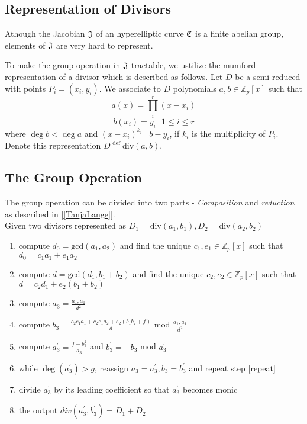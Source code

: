 \subsection{Representation of Divisors}

Athough the Jacobian $\mathfrak{J}$ of an hyperelliptic curve $\mathfrak{C}$ is a finite abelian group, elements of $\mathfrak{J}$ are very hard to represent. 



To make the group operation in $\mathfrak{J}$ tractable, we ustilize the mumford representation of a divisor which is described as follows. Let $D$ be a semi-reduced with points $P_i = (x_i,y_i)$. We associate to $D$ polynomials $a,b \in \mathbb{Z}_p[x]$ such that $$a(x) = \prod^r_i (x - x_i) $$ $$ b(x_i) = y_i \text{ } 1 \leq i \leq r $$ where $\deg b < \deg a$ and $(x - x_i)^{k_i} \mid b - y_i$, if $k_i$ is the multiplicity of $P_i$. Denote this representation $D \stackrel{\text{def}}{=} \text{div} (a,b)$.

\subsection{The Group Operation}

The group operation can be divided into two parts - \textit{Composition} and \textit{reduction} as described in [\ref{TanjaLange}]. \\ 	

Given two divisors represented as $D_1= \text{div}(a_1,b_1), D_2 = \text{div} (a_2,b_2) $ 

\begin{enumerate}[1.]
	\item compute $d_0 = \text{gcd}(a_1,a_2)$ and find the unique $c_1,e_1 \in \mathbb{Z}_p[x]$ such that $d_0 = c_1a_1 + e_1a_2$ 
	\item compute $d = \text{gcd}(d_1,b_1 + b_2)$ and find the unique $c_2, e_2 \in \mathbb{Z}_p[x]$ such that $d = c_2d_1 + e_2(b_1 + b_2)$ 
	\item compute $a_3 = \frac{a_1,a_1}{d^2}$
	\item compute $b_3 = \frac{c_2c_1a_1 + c_2e_1a_2 + e_2(b_1b_2 + f)}{d} \text{ mod } \frac{a_1,a_1}{d^2}$
	\item \label{repeat} compute $a_3^\prime = \frac{f - b_3^2}{a_3}$ and $b_3^\prime = - b_3$ mod $a_3^\prime$ 
	\item while $\deg (a_3^\prime ) > g$, reassign $a_3 = a_3^\prime, b_3 = b_3^\prime$ and repeat step \ref{repeat}
	\item divide $a_3^\prime $ by its leading coefficient so that $a_3^\prime $ becomes monic
	\item the output $div(a_3^\prime,b_3^\prime) = D_1 + D_2$ 
\end{enumerate}


